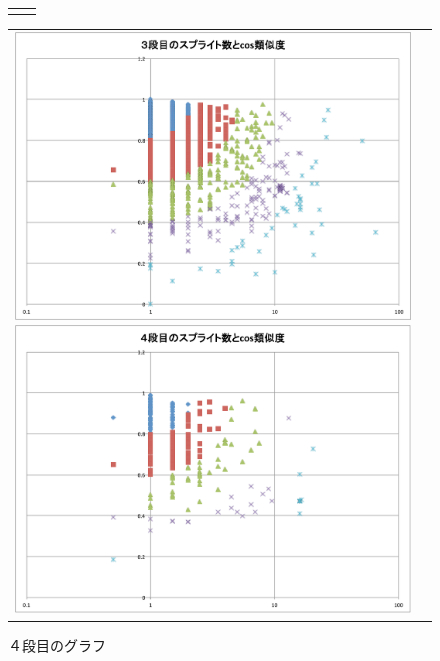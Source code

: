 \documentclass[twocolumn,9pt,a4paper]{jsarticle}
\begin{document}
\begin{figure}[ht]
\begin{tabular}{cc}
\begin{minipage}[t]{0.45\hsize}
	\end{minipage}
 \end{tabular}
  \begin{tabular}{cc}
 	\begin{minipage}[t]{0.45\hsize}
	 \centering
	 \includegraphics[keepaspectratio, scale = 0.15]{graph_3_splite.pdf}
	 \caption{３段目のグラフ}
	 \label{third_splite}
	\end{minipage}
        \begin{minipage}[t]{0.45\hsize}
	 \centering
	 \includegraphics[keepaspectratio, scale = 0.15]{graph_4_splite.pdf}
	 \caption{４段目のグラフ}
	 \label{fourth_splite}
	\end{minipage}
 \end{tabular}
 \end{figure}
\end{document}
